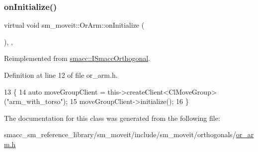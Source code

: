 \subsubsection{\texorpdfstring{on\+Initialize()}{onInitialize()}}
{\footnotesize\ttfamily virtual void sm\+\_\+moveit\+::\+Or\+Arm\+::on\+Initialize (\begin{DoxyParamCaption}{ }\end{DoxyParamCaption})\hspace{0.3cm}{\ttfamily [inline]}, {\ttfamily [override]}, {\ttfamily [virtual]}}



Reimplemented from \hyperlink{classsmacc_1_1ISmaccOrthogonal_a6bb31c620cb64dd7b8417f8705c79c7a}{smacc\+::\+I\+Smacc\+Orthogonal}.



Definition at line 12 of file or\+\_\+arm.\+h.


\begin{DoxyCode}
13     \{
14         \textcolor{keyword}{auto} moveGroupClient = this->createClient<ClMoveGroup>(\textcolor{stringliteral}{"arm\_with\_torso"});
15         moveGroupClient->initialize();
16     \}
\end{DoxyCode}


The documentation for this class was generated from the following file\+:\begin{DoxyCompactItemize}
\item 
smacc\+\_\+sm\+\_\+reference\+\_\+library/sm\+\_\+moveit/include/sm\+\_\+moveit/orthogonals/\hyperlink{include_2sm__moveit_2orthogonals_2or__arm_8h}{or\+\_\+arm.\+h}\end{DoxyCompactItemize}
